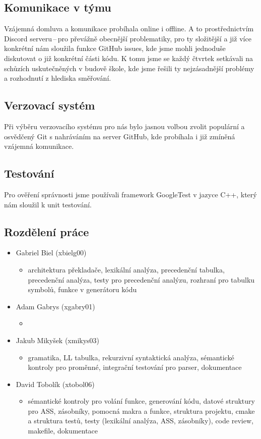 \documentclass[a4paper, 12pt]{article}
\begin{document}
    \subsection{Komunikace v týmu}
        Vzájemná domluva a komunikace probíhala online i offline. A to prostřednictvím Discord serveru\,--\,pro převážně obecnější problematiky, pro ty složitější a již více konkrétní nám sloužila funkce GitHub issues, kde jsme mohli jednoduše diskutovat o již konkrétní části kódu. K tomu jsme se každý čtvrtek setkávali na schůzích uskutečněných v budově škole, kde jsme řešili ty nejzásadnější problémy a rozhodnutí z hlediska směřování.
    \subsection{Verzovací systém}
        Při výběru verzovacího systému pro nás bylo jasnou volbou zvolit populární a osvědčený Git s nahráváním na server GitHub, kde probíhala i již zmíněná vzájemná komunikace.
    \subsection{Testování}
        Pro ověření správnosti jsme používali framework GoogleTest v jazyce C++, který nám sloužil k unit testování.
    \subsection{Rozdělení práce}
        \begin{itemize}
            \item Gabriel Biel (xbielg00)
                \begin{itemize}
                    \item architektura překladače, lexikální analýza, precedenční tabulka, precedenční analýza, testy pro precedenční analýzu, rozhraní pro tabulku symbolů, funkce v generátoru kódu
                \end{itemize}
            \item Adam Gabrys (xgabry01)
                \begin{itemize}
                    \item
                \end{itemize}
            \item Jakub Mikyšek (xmikys03)
                \begin{itemize}
                    \item gramatika, LL tabulka, rekurzivní syntaktická analýza, sémantické kontroly pro proměnné, integrační testování pro parser, dokumentace
                \end{itemize}
            \item David Tobolík (xtobol06)
                \begin{itemize}
                    \item sémantické kontroly pro volání funkce, generování kódu, datové struktury pro ASS, zásobníky, pomocná makra a funkce, struktura projektu, cmake a struktura testů, testy (lexikální analýza, ASS, zásobníky), code review, makefile, dokumentace
                \end{itemize}
        \end{itemize}
\end{document}
